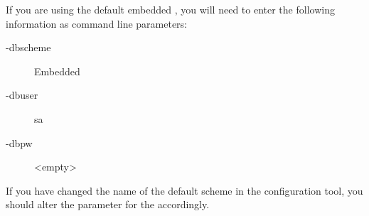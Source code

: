 
If you are using the default embedded \gddb{}, you will need to enter the following information as command line parameters:
\begin{description}
\item[-dbscheme]{Embedded}
\item[-dbuser]{sa}
\item[-dbpw]{<empty>}

\end{description}
If you have changed the name of the default \gddb{} scheme in the configuration tool, you should alter the parameter for the  accordingly. 
